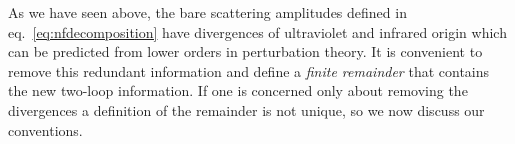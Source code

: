 As we have seen above,
the bare scattering amplitudes defined in eq.~\eqref{eq:nfdecomposition}
have divergences of ultraviolet and infrared origin which can be predicted from lower orders in perturbation theory.
It is convenient to remove this redundant information and define a \emph{finite remainder} that contains the new two-loop information.
If one is concerned only about removing the divergences a definition of the remainder is not unique, so we now discuss our conventions.



